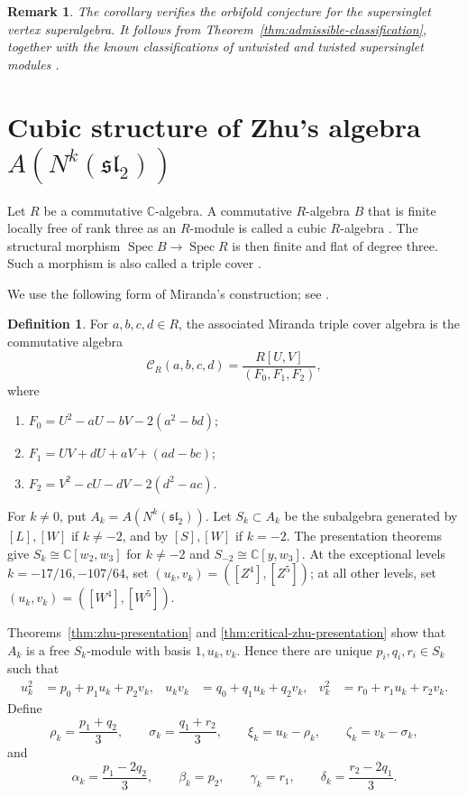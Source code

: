\documentclass[11 pt]{amsart}
\newtheorem{remark}{Remark}
\theoremstyle{definition}
\newtheorem{definition}{Definition}
\theoremstyle{plain}
\begin{document}
\begin{remark}
The corollary verifies the orbifold conjecture for the
supersinglet vertex superalgebra.
It follows from Theorem~\ref{thm:admissible-classification}, together
with the known classifications of untwisted and twisted supersinglet
modules \cite{AMSuperTriplet,AMSuperTripletTwisted}.
\end{remark}

\section{Cubic structure of Zhu's algebra
$A(N^k(\mathfrak{sl}_2))$}
\label{sec:cubic-zhu}

Let $R$ be a commutative $\mathbb C$-algebra. A commutative
$R$-algebra $B$ that is finite locally free of rank three as an
$R$-module is called a cubic $R$-algebra \cite{Wood}. The structural
morphism $\operatorname{Spec}B\to\operatorname{Spec}R$ is then finite
and flat of degree three. Such a morphism is also called a triple
cover \cite{Miranda}.

We use the following form of Miranda's construction; see
\cite[Theorem~2.7 and Remark~2.8.2]{Miranda}.

\begin{definition}\label{def:miranda-normal-form}
For $a,b,c,d\in R$, the associated Miranda triple cover algebra is the
commutative algebra
\[
\mathcal C_R(a,b,c,d)
=\frac{R[U,V]}{(F_0,F_1,F_2)},
\]
where
\begin{enumerate}[label=(\arabic*),leftmargin=3em]
\item $F_0=U^2-aU-bV-2(a^2-bd)$;
\item $F_1=UV+dU+aV+(ad-bc)$;
\item $F_2=V^2-cU-dV-2(d^2-ac)$.
\end{enumerate}
\end{definition}



For $k\neq0$, put $A_k=A(N^k(\mathfrak{sl}_2))$. Let $S_k\subset A_k$
be the subalgebra generated by $[L],[W]$ if $k\neq-2$, and by
$[S],[W]$ if $k=-2$. The presentation theorems give
$S_k\cong\mathbb C[w_2,w_3]$ for $k\neq-2$ and
$S_{-2}\cong\mathbb C[y,w_3]$. At the exceptional levels
$k=-17/16,-107/64$, set $(u_k,v_k)=([Z^4],[Z^5])$; at all other
levels, set $(u_k,v_k)=([W^4],[W^5])$.

Theorems~\ref{thm:zhu-presentation} and
\ref{thm:critical-zhu-presentation} show that $A_k$ is a free
$S_k$-module with basis $1,u_k,v_k$. Hence there are unique
$p_i,q_i,r_i\in S_k$ such that
\begin{align*}
u_k^2&=p_0+p_1u_k+p_2v_k,&
u_kv_k&=q_0+q_1u_k+q_2v_k,&
v_k^2&=r_0+r_1u_k+r_2v_k.
\end{align*}
Define
\[
\rho_k=\frac{p_1+q_2}{3},\qquad
\sigma_k=\frac{q_1+r_2}{3},\qquad
\xi_k=u_k-\rho_k,\qquad \zeta_k=v_k-\sigma_k,
\]
and
\[
\alpha_k=\frac{p_1-2q_2}{3},\qquad \beta_k=p_2,\qquad
\gamma_k=r_1,\qquad \delta_k=\frac{r_2-2q_1}{3}.
\]
\end{document}
